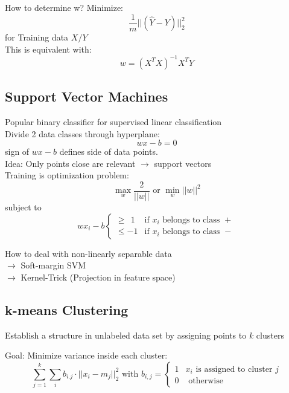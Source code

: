 How to determine w? Minimize:
\[\frac{1}{m} || (\hat{Y} - Y)||^2_2\]
for Training data \(X / Y\)\\

This is equivalent with:
\[ w = {(X^T X)}^{-1} X^T Y\]

\subsection{Support Vector Machines}%
\label{ml:sub:support_vector_machines}
Popular binary classifier for supervised linear classification\\
Divide 2 data classes through hyperplane:
\[wx - b = 0\]
sign of \(wx - b\) defines side of data points.\\

Idea: Only points close are relevant \(\rightarrow\) support vectors\\

Training is optimization problem:
\[\max_w \frac{2}{|| w ||} \text{ or } \min_w ||w||^2\]
subject to
\[
  wx_i - b
  \begin{cases}
    \geq \  \ 1  &\text{if } x_i \text{ belongs to class }+\\
    \leq -1  &\text{if } x_i \text{ belongs to class } -
  \end{cases}
\]
  
How to deal with non-linearly separable data\\
\(\rightarrow\) Soft-margin SVM\\
\(\rightarrow\) Kernel-Trick (Projection in feature space)


\subsection{k-means Clustering}%
\label{ml:sub:k_means_clustering}
Establish a structure in unlabeled data set by assigning points to \(k\) clusters

Goal: Minimize variance inside each cluster:
\[
  \sum_{j=1}^k \sum_i b_{i.j} \cdot || x_i - m_j ||^2_2
  \text{ with } b_{i,j} = \begin{cases} 1 & x_i \text{ is assigned to cluster } j\\ 0 & \text{ otherwise}\end{cases}
\]


